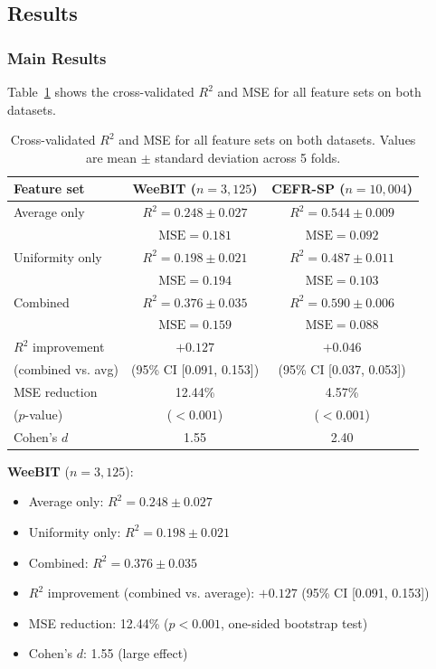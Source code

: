 \documentclass[11pt,letterpaper]{article}
\begin{document}
\subsection{Results}

\subsubsection{Main Results}

Table~\ref{tab:main_results} shows the cross-validated $R^2$ and MSE for all feature sets on both datasets.

\begin{table}[!htbp]
  \centering
  \caption{Cross-validated $R^2$ and MSE for all feature sets on both datasets. Values are mean $\pm$ standard deviation across 5 folds.}
  \label{tab:main_results}
  \begin{tabular}{lcc}
    \toprule
    Feature set & WeeBIT ($n=3,125$) & CEFR-SP ($n=10,004$) \\
    \midrule
    Average only & $R^2 = 0.248 \pm 0.027$ & $R^2 = 0.544 \pm 0.009$ \\
                 & $\mathrm{MSE} = 0.181$ & $\mathrm{MSE} = 0.092$ \\
    Uniformity only & $R^2 = 0.198 \pm 0.021$ & $R^2 = 0.487 \pm 0.011$ \\
                    & $\mathrm{MSE} = 0.194$ & $\mathrm{MSE} = 0.103$ \\
    Combined & $R^2 = 0.376 \pm 0.035$ & $R^2 = 0.590 \pm 0.006$ \\
             & $\mathrm{MSE} = 0.159$ & $\mathrm{MSE} = 0.088$ \\
    \midrule
    $R^2$ improvement & $+0.127$ & $+0.046$ \\
    (combined vs. avg) & (95\% CI [0.091, 0.153]) & (95\% CI [0.037, 0.053]) \\
    MSE reduction & 12.44\% & 4.57\% \\
    ($p$-value) & ($< 0.001$) & ($< 0.001$) \\
    Cohen's $d$ & 1.55 & 2.40 \\
    \bottomrule
  \end{tabular}
\end{table}

\textbf{WeeBIT} ($n = 3,125$):
\begin{itemize}
  \item Average only: $R^2 = 0.248 \pm 0.027$
  \item Uniformity only: $R^2 = 0.198 \pm 0.021$
  \item Combined: $R^2 = 0.376 \pm 0.035$
  \item $R^2$ improvement (combined vs. average): $+0.127$ (95\% CI [0.091, 0.153])
  \item MSE reduction: 12.44\% ($p < 0.001$, one-sided bootstrap test)
  \item Cohen's $d$: 1.55 (large effect)
\end{itemize}
\end{document}
